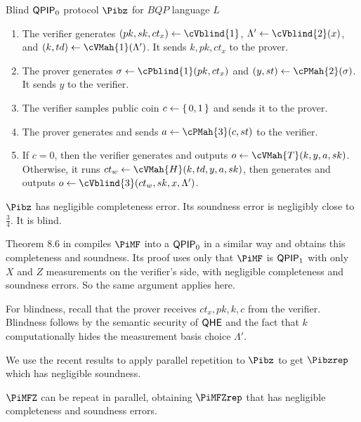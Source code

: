 \begin{protocol}{Blind $\operatorname{\mathsf{QPIP}}_0$ protocol $\Pibz$ for $BQP$ language $L$}
	\label{proto:QPIP0BQP}
	\begin{enumerate}
		\item The verifier generates $(pk, sk, ct_x)\leftarrow\cVblind{1}$,
			$\Lambda'\leftarrow\cVblind{2}(x)$,
			and $(k, td)\leftarrow\cVMah{1}(\Lambda')$.
			It sends $k, pk, ct_x$ to the prover.
		\item The prover generates $\sigma\leftarrow\cPblind{1}(pk, ct_x)$ and
			$(y, st)\leftarrow\cPMah{2}(\sigma)$.
			It sends $y$ to the verifier.
		\item The verifier samples public coin $c\leftarrow\set{0, 1}$ and sends it to the prover.
		\item The prover generates and sends $a\leftarrow\cPMah{3}(c, st)$ to the verifier.
		\item If $c=0$, then the verifier generates and outputs $o\leftarrow\cVMah{T}(k, y, a, sk)$.
			Otherwise, it runs $ct_w\leftarrow\cVMah{H}(k, td, y, a, sk)$,
			then generates and outputs $o\leftarrow\cVblind{3}(ct_w, sk, x, \Lambda')$.
	\end{enumerate}
\end{protocol}

\begin{thm}
	$\Pibz$ has negligible completeness error. Its soundness error is negligibly close to $\frac{3}{4}$. It is blind.
\end{thm}
\begin{prf}
	Theorem $8.6$ in \cite{FOCS:Mahadev18a} compiles $\PiMF$ into a $\operatorname{\mathsf{QPIP}}_0$ in a similar way and obtains this completeness and soundness.
	Its proof uses only that $\PiMF$ is $\operatorname{\mathsf{QPIP}}_1$ with only $X$ and $Z$ measurements on the verifier's side, with negligible completeness and soundness errors.
	So the same argument applies here. 

	For blindness, recall that the prover receives $ct_x, pk, k, c$ from the verifier.
	Blindness follows by the semantic security of $\mathsf{QHE}$ and the fact that $k$ computationally hides the measurement basis choice $\Lambda'$.
\end{prf}

We use the recent results \cite{parallelrep, alagic2019twomessage} to apply parallel repetition to $\Pibz$ to get $\Pibzrep$ which has negligible soundness.

\begin{thm}
	\label{thm:MFZrep}
	$\PiMFZ$ can be repeat in parallel, obtaining $\PiMFZrep$ that has negligible completeness and soundness errors.
\end{thm}

